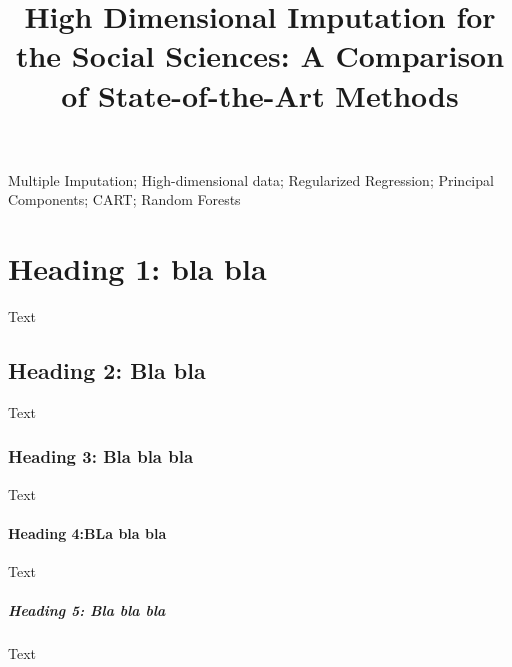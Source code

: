 \documentclass[]{./cls/interact}
\theoremstyle{plain}
\theoremstyle{definition}
\theoremstyle{remark}
\begin{document}

\title{High Dimensional Imputation for the Social Sciences: A Comparison of State-of-the-Art Methods}

\author{
}

\maketitle

\begin{abstract}
	
\end{abstract}

\begin{keywords}
	Multiple Imputation; High-dimensional data; Regularized Regression; Principal Components; CART; Random Forests
\end{keywords}

\section{Heading 1: bla bla} Text
\subsection{Heading 2: Bla bla} Text 
\subsubsection{Heading 3: Bla bla bla} Text
\paragraph{Heading 4:BLa bla bla} Text
\subparagraph{Heading 5: Bla bla bla} Text









\end{document}
